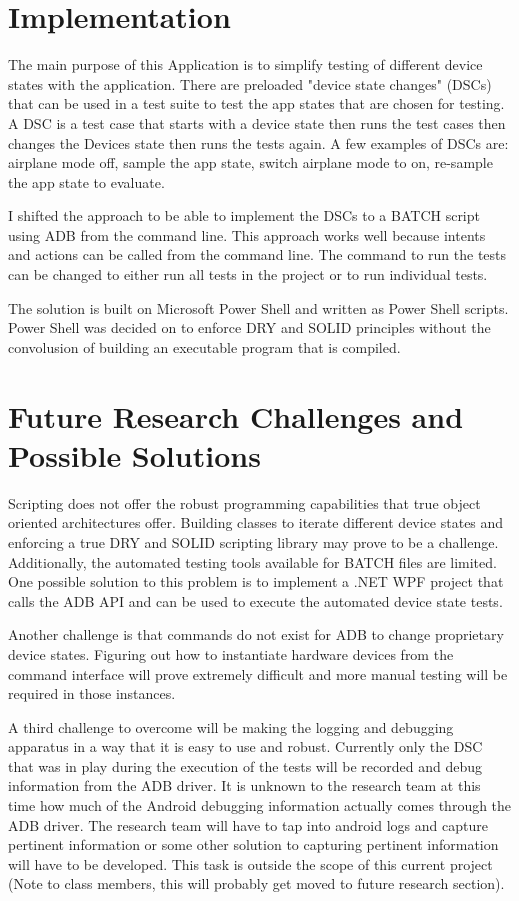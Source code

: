 \section{Implementation}
The main purpose of this Application is to simplify testing of different device states with the application.  There are preloaded "device state changes" (DSCs) that can be used in a test suite to test the app states that are chosen for testing.  A DSC is a test case that starts with a device state then runs the test cases then changes the Devices state then runs the tests again.  A few examples of DSCs are: airplane mode off, sample the app state, switch airplane mode to on, re-sample the app state to evaluate.

I shifted the approach to be able to implement the DSCs to a BATCH script using ADB from the command line.  This approach works well because intents and actions can be called from the command line.  The command to run the tests can be changed to either run all tests in the project or to run individual tests.  

The solution is built on Microsoft Power Shell and written as Power Shell scripts.  Power Shell was decided on to enforce DRY and SOLID principles without the convolusion of building an executable program that is compiled.  

\section{Future Research Challenges and Possible Solutions}
Scripting does not offer the robust programming capabilities that true object oriented architectures offer.  Building classes to iterate different device states and enforcing a true DRY and SOLID scripting library may prove to be a challenge.  Additionally, the automated testing tools available for BATCH files are limited.  One possible solution to this problem is to implement a .NET WPF project that calls the ADB API and can be used to execute the automated device state tests.  

Another challenge is that commands do not exist for ADB to change proprietary device states.  Figuring out how to instantiate hardware devices from the command interface will prove extremely difficult and more manual testing will be required in those instances.   

A third challenge to overcome will be making the logging and debugging apparatus in a way that it is easy to use and robust.  Currently only the DSC that was in play during the execution of the tests will be recorded and debug information from the ADB driver.  It is unknown to the research team at this time how much of the Android debugging information actually comes through the ADB driver.  The research team will have to tap into android logs and capture pertinent information or some other solution to capturing pertinent information will have to be developed.  This task is outside the scope of this current project (Note to class members, this will probably get moved to future research section).\\ \\

